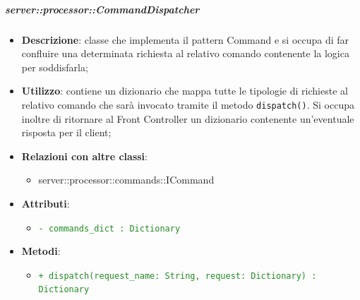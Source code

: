 \subparagraph{server::processor::CommandDispatcher} %
    \label{subp:bdsm_app_server_:processor_commanddispatcher}
    \begin{itemize}
      \item \textbf{Descrizione}: classe che implementa il pattern Command e si occupa di far confluire una determinata richiesta al relativo comando contenente la logica per soddisfarla;
      \item \textbf{Utilizzo}: contiene un dizionario che mappa tutte le tipologie di richieste al relativo comando che sarà invocato tramite il metodo \texttt{dispatch()}. Si occupa inoltre di ritornare al Front Controller un dizionario contenente un'eventuale risposta per il client;
      \item \textbf{Relazioni con altre classi}:
        \begin{itemize}
          \item server::processor::commands::ICommand
        \end{itemize}
    \item \textbf{Attributi}:
          \begin{itemize}
              \item \textcolor{forestgreen}{\texttt{- commands\_dict : Dictionary}}
          \end{itemize}
    \item \textbf{Metodi}:
          \begin{itemize}
              \item \textcolor{forestgreen}{\texttt{+ dispatch(request\_name: String, request: Dictionary) : Dictionary}}
          \end{itemize}
      \end{itemize}


